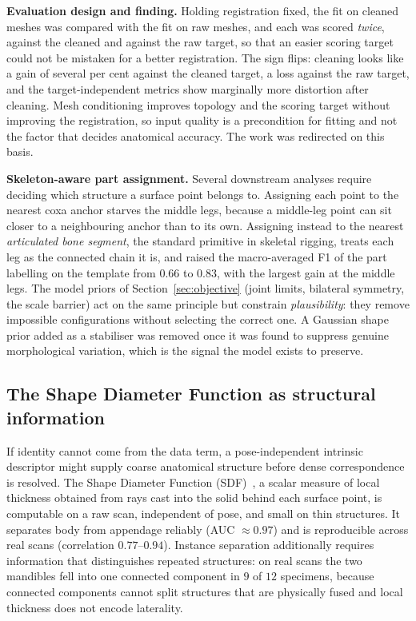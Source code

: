 \textbf{Evaluation design and finding.} Holding registration fixed, the fit on
cleaned meshes was compared with the fit on raw meshes, and each was scored
\emph{twice}, against the cleaned and against the raw target, so that an easier
scoring target could not be mistaken for a better registration. The sign flips:
cleaning looks like a gain of several per cent against the cleaned target, a loss
against the raw target, and the target-independent metrics show marginally more
distortion after cleaning. Mesh conditioning improves topology and the scoring
target without improving the registration, so input quality is a precondition for
fitting and not the factor that decides anatomical accuracy. The work was
redirected on this basis.

\textbf{Skeleton-aware part assignment.} Several downstream analyses require
deciding which structure a surface point belongs to. Assigning each point to the
nearest coxa anchor starves the middle legs, because a middle-leg point can sit
closer to a neighbouring anchor than to its own. Assigning instead to the nearest
\emph{articulated bone segment}, the standard primitive in skeletal rigging,
treats each leg as the connected chain it is, and raised the macro-averaged F1 of
the part labelling on the template from $0.66$ to $0.83$, with the largest gain at
the middle legs. The model priors of Section~\ref{sec:objective} (joint limits,
bilateral symmetry, the scale barrier) act on the same principle but constrain
\emph{plausibility}: they remove impossible configurations without selecting the
correct one. A Gaussian shape prior added as a stabiliser was removed once it was
found to suppress genuine morphological variation, which is the signal the model
exists to preserve.

\subsection{The Shape Diameter Function as structural information}
\label{sec:sdf}

If identity cannot come from the data term, a pose-independent intrinsic
descriptor might supply coarse anatomical structure before dense correspondence is
resolved. The Shape Diameter Function (SDF)~\cite{sdf}, a scalar measure of local
thickness obtained from rays cast into the solid behind each surface point, is
computable on a raw scan, independent of pose, and small on thin structures. It
separates body from appendage reliably (AUC $\approx0.97$) and is reproducible
across real scans (correlation $0.77$--$0.94$). Instance separation additionally
requires information that distinguishes repeated structures: on real scans the two
mandibles fell into one connected component in $9$ of $12$ specimens, because
connected components cannot split structures that are physically fused and local
thickness does not encode laterality.

